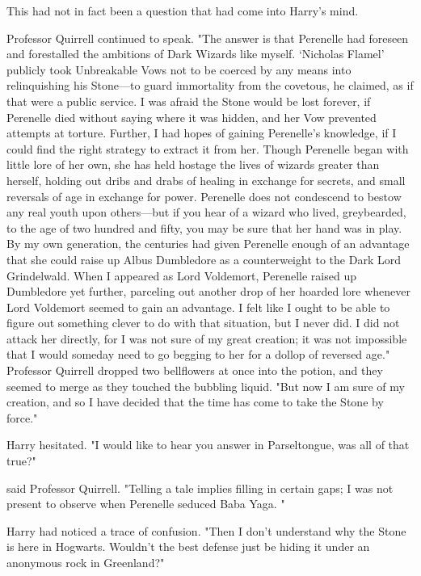 This had not in fact been a question that had come into Harry's mind.

Professor Quirrell continued to speak. "The answer is that Perenelle had
foreseen and forestalled the ambitions of Dark Wizards like myself. `Nicholas
Flamel' publicly took Unbreakable Vows not to be coerced by any means into
relinquishing his Stone---to guard immortality from the covetous, he claimed,
as if that were a public service. I was afraid the Stone would be lost forever,
if Perenelle died without saying where it was hidden, and her Vow prevented
attempts at torture. Further, I had hopes of gaining Perenelle's knowledge, if
I could find the right strategy to extract it from her. Though Perenelle began
with little lore of her own, she has held hostage the lives of wizards greater
than herself, holding out dribs and drabs of healing in exchange for secrets,
and small reversals of age in exchange for power. Perenelle does not condescend
to bestow any real youth upon others---but if you hear of a wizard who lived,
greybearded, to the age of two hundred and fifty, you may be sure that her hand
was in play. By my own generation, the centuries had given Perenelle enough of
an advantage that she could raise up Albus Dumbledore as a counterweight to the
Dark Lord Grindelwald. When I appeared as Lord Voldemort, Perenelle raised up
Dumbledore yet further, parceling out another drop of her hoarded lore whenever
Lord Voldemort seemed to gain an advantage. I felt like I ought to be able to
figure out something clever to do with that situation, but I never did. I did
not attack her directly, for I was not sure of my great creation; it was not
impossible that I would someday need to go begging to her for a dollop of
reversed age." Professor Quirrell dropped two bellflowers at once into the
potion, and they seemed to merge as they touched the bubbling liquid. "But now
I am sure of my creation, and so I have decided that the time has come to take
the Stone by force."

Harry hesitated. "I would like to hear you answer in Parseltongue, was all of
that true?"

 said Professor Quirrell.
"Telling a tale implies filling in certain gaps; I was not present to observe
when Perenelle seduced Baba Yaga. "

Harry had noticed a trace of confusion. "Then I don't understand why the
Stone is here in Hogwarts. Wouldn't the best defense just be hiding it under an
anonymous rock in Greenland?"

